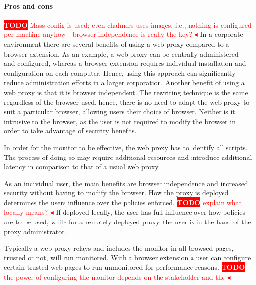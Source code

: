 \documentclass{llncs}
\newcommand{\todo}[1]{\colorbox{red}{\textcolor{white}{\sffamily\bfseries\scriptsize TODO}} \textcolor{red}{#1} \textcolor{red}{$\blacktriangleleft$}}
\begin{document}
\paragraph{Pros and cons}
\todo{Mass config is used; even chalmers uses images, i.e., nothing is configured per machine anyhow - browser independence is really
the key?}
In a corporate environment there are several benefits of using a web proxy 
compared to a browser extension. As an example, a web proxy can be centrally 
administered and configured, whereas a browser extension requires individual installation 
and configuration on each computer. Hence, using this approach can significantly 
reduce administration efforts in a larger corporation. 
Another benefit of using a web proxy is that it is browser independent. The 
rewriting technique is the same regardless of the browser used, hence, there is no 
need to adapt the web proxy to suit a particular browser, allowing 
users their choice of browser.
Neither is it intrusive to the browser, as the user is not required to modify the 
browser in order to take advantage of security benefits. 

In order for the monitor to be effective, the web proxy 
has to identify all scripts. The process of doing so may require additional 
resources and introduce additional 
latency in comparison to that of a usual web proxy.

As an individual user, the main benefits are browser independence and  
increased security without having to modify the browser. How the proxy is 
deployed determines the users influence over 
the policies enforced.
\todo{explain what locally means?}
If deployed locally, the user has full influence over 
how policies are to be used, while for a remotely deployed proxy, the user is 
in the hand of the proxy administrator. 

Typically a web proxy relays and includes the monitor in all browsed pages, 
trusted or not, will run monitored. With a browser extension a user can
configure certain trusted web pages to run unmonitored for performance reasons.
\todo{the power of configuring the monitor depends on the stakeholder and the }
\end{document}
